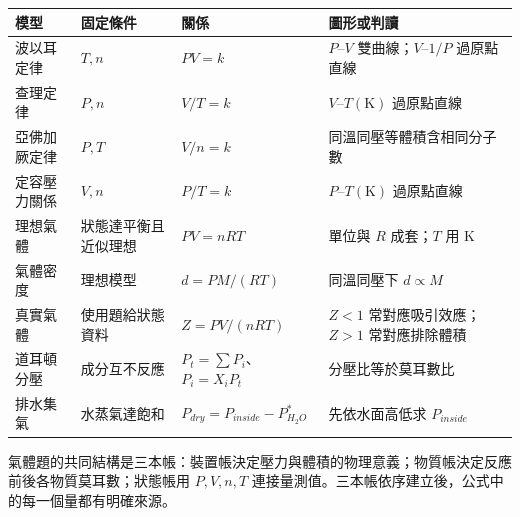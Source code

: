 \documentclass[11pt,a4paper]{article}
\newcounter{none}
\begin{document}
{\def\LTcaptype{none} %
\begin{longtable}[]{@{}
  >{\raggedright\arraybackslash}p{}
  >{\raggedright\arraybackslash}p{}
  >{\raggedright\arraybackslash}p{}
  >{\raggedright\arraybackslash}p{}@{}}
\toprule\noalign{}
\begin{minipage}[b]{\linewidth}\raggedright
模型
\end{minipage} & \begin{minipage}[b]{\linewidth}\raggedright
固定條件
\end{minipage} & \begin{minipage}[b]{\linewidth}\raggedright
關係
\end{minipage} & \begin{minipage}[b]{\linewidth}\raggedright
圖形或判讀
\end{minipage} \\
\midrule\noalign{}
\endhead
\bottomrule\noalign{}
\endlastfoot
波以耳定律 & \(T,n\) & \(PV=k\) & \(P\)--\(V\) 雙曲線；\(V\)--\(1/P\) 過原點直線 \\
查理定律 & \(P,n\) & \(V/T=k\) & \(V\)--\(T(\mathrm K)\) 過原點直線 \\
亞佛加厥定律 & \(P,T\) & \(V/n=k\) & 同溫同壓等體積含相同分子數 \\
定容壓力關係 & \(V,n\) & \(P/T=k\) & \(P\)--\(T(\mathrm K)\) 過原點直線 \\
理想氣體 & 狀態達平衡且近似理想 & \(PV=nRT\) & 單位與 \(R\) 成套；\(T\) 用 K \\
氣體密度 & 理想模型 & \(d=PM/(RT)\) & 同溫同壓下 \(d\propto M\) \\
真實氣體 & 使用題給狀態資料 & \(Z=PV/(nRT)\) & \(Z<1\) 常對應吸引效應；\(Z>1\) 常對應排除體積 \\
道耳頓分壓 & 成分互不反應 & \(P_t=\sum P_i\)、\(P_i=X_iP_t\) & 分壓比等於莫耳數比 \\
排水集氣 & 水蒸氣達飽和 & \(P_{dry}=P_{inside}-P_{H_2O}^*\) & 先依水面高低求 \(P_{inside}\) \\
\end{longtable}
}

氣體題的共同結構是三本帳：裝置帳決定壓力與體積的物理意義；物質帳決定反應前後各物質莫耳數；狀態帳用 \(P,V,n,T\) 連接量測值。三本帳依序建立後，公式中的每一個量都有明確來源。
\end{document}
